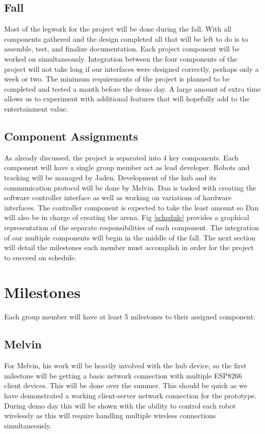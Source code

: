 \documentclass[11pt]{ieeeconf}
\begin{document}
\subsection{Fall}
Most of the legwork for the project will be done during the fall. With all components gathered and the design completed all that will be left to do is to assemble, test, and finalize documentation. Each project component will be worked on simultaneously. Integration between the four components of the project will not take long if our interfaces were designed correctly, perhaps only a week or two. The minimum requirements of the project is planned to be completed and tested a month before the demo day. A large amount of extra time allows us to experiment with additional features that will hopefully add to the entertainment value.

\subsection{Component Assignments}
As already discussed, the project is separated into 4 key components. Each component will have a single group member act as lead developer. Robots and tracking will be managed by Jaden. Development of the hub and its communication protocol will be done by Melvin. Dan is tasked with creating the software controller interface as well as working on variations of hardware interfaces. The controller component is expected to take the least amount so Dan will also be in charge of creating the arena. Fig \ref{schedule} provides a graphical representation of the separate responsibilities of each component. The integration of our multiple components will begin in the middle of the fall. The next section will detail the milestones each member must accomplish in order for the project to succeed on schedule.

\section{Milestones}
Each group member will have at least 5 milestones to their assigned component: 

\subsection{Melvin}
For Melvin, his work will be heavily involved with the hub device, so the first milestone will be getting a basic network connection with multiple ESP8266 client devices. This will be done over the summer. This should be quick as we have demonstrated a working client-server network connection for the prototype. During demo day this will be shown with the ability to control each robot wirelessly as this will require handling multiple wireless connections simultaneously.
\end{document}

